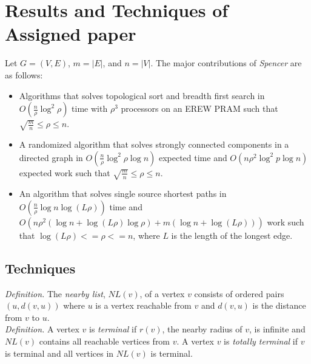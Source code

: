 \documentclass[paper=a4, fontsize=11pt]{scrartcl} %
\numberwithin{equation}{section} %
\numberwithin{figure}{section} %
\numberwithin{table}{section} %
\begin{document}

\section{Results and Techniques of Assigned paper}

Let $G = (V,E)$, $m = |E|$, and $n = |V|$. The major contributions of \textit{Spencer\cite{S97}} are as follows:

\begin{itemize}
\item Algorithms that solves topological sort and breadth first search in $O(\frac{n}{\rho}\log^2{\rho})$ time with $\rho^3$ processors on an EREW PRAM such that $ \sqrt{\frac{m}{n}} \leq \rho \leq n$.
\item A randomized algorithm that solves strongly connected components in a directed graph in $O(\frac{n}{\rho}\log^2{\rho}\log{n})$ expected time and $O(n\rho^2\log^2{p}\log{n})$ expected work such that $ \sqrt{\frac{m}{n}} \leq \rho \leq n$.
\item An algorithm that solves single source shortest paths in $O(\frac{n}{\rho}\log{n}\log{(L\rho)})$ time and $O(n\rho^2(\log{n} + \log{(L\rho)}\log{\rho}) + m(\log{n} + \log{(L\rho)}))$ work such that $\log{(L\rho)} <= \rho <= n$, where $L$ is the length of the longest edge.
\end{itemize}

\subsection{Techniques}
\hfill

\textit{Definition.} The \textit{nearby list}, $NL(v)$, of a vertex $v$ consists of ordered pairs $(u, d(v,u))$ where $u$ is a vertex reachable from $v$ and $d(v,u)$ is the distance from $v$ to $u$.\\



\textit{Definition.} A vertex $v$ is \textit{terminal} if $r(v)$, the nearby radius of $v$, is infinite and $NL(v)$ contains all reachable vertices from $v$. A vertex $v$ is \textit{totally terminal} if $v$ is terminal and all vertices in $NL(v)$ is terminal.\\
\end{document}
